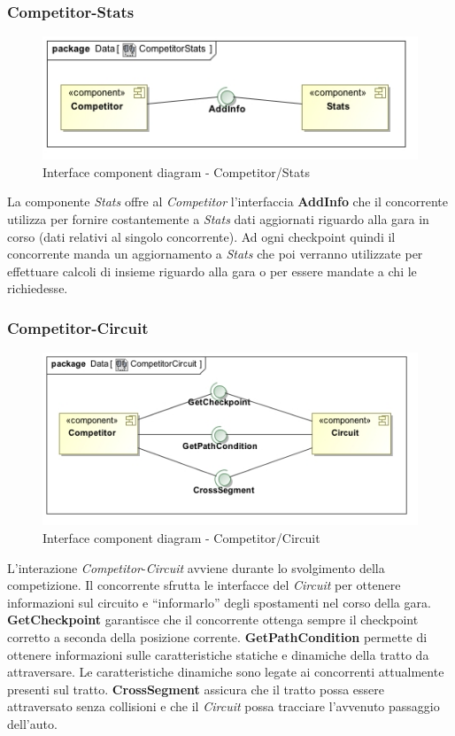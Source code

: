 \subsubsection{Competitor-Stats}
\begin{center}
\begin{figure}[h!]
	\includegraphics[scale=0.55]{img/InteractionDiagram/Implementation_Diagram__CompetitorStats.jpg}
\caption{Interface component diagram - Competitor/Stats}
\end{figure}
\end{center}
La componente \emph{Stats} offre al \emph{Competitor} l'interfaccia \textbf{AddInfo} che il concorrente utilizza per fornire costantemente a \emph{Stats}
dati aggiornati riguardo alla gara in corso (dati relativi al singolo concorrente). Ad ogni checkpoint quindi il concorrente manda un aggiornamento
a \emph{Stats} che poi verranno utilizzate per effettuare calcoli di insieme riguardo alla gara o per essere mandate a chi le richiedesse.
\subsubsection{Competitor-Circuit}
\begin{center}
\begin{figure}[h!]
	\includegraphics[scale=0.55]{img/InteractionDiagram/Implementation_Diagram__CompetitorCircuit.jpg}
\caption{Interface component diagram - Competitor/Circuit}
\end{figure}
\end{center}
L'interazione \emph{Competitor}-\emph{Circuit} avviene durante lo svolgimento della competizione. Il concorrente sfrutta le interfacce del \emph{Circuit}
per ottenere informazioni sul circuito e ``informarlo'' degli spostamenti nel corso della gara.\\
\textbf{GetCheckpoint} garantisce che il concorrente ottenga sempre il checkpoint corretto a seconda della posizione corrente.
\textbf{GetPathCondition} permette di ottenere informazioni sulle caratteristiche statiche e dinamiche della tratto da attraversare. Le caratteristiche 
dinamiche sono legate ai concorrenti attualmente presenti sul tratto.
\textbf{CrossSegment} assicura che il tratto possa essere attraversato senza collisioni e che il \emph{Circuit} possa tracciare l'avvenuto passaggio 
dell'auto.
